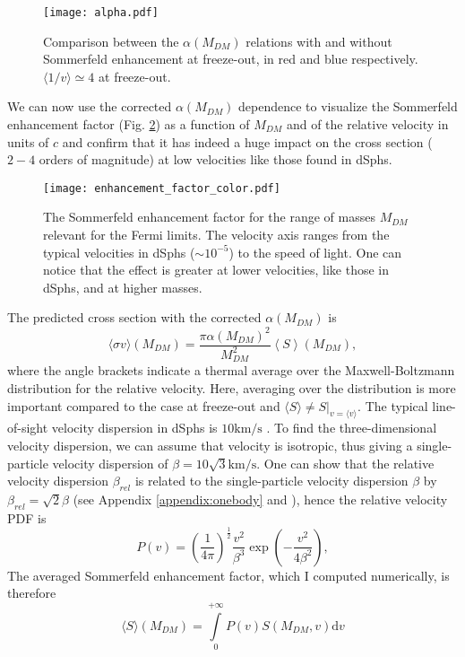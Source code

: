 \begin{figure}[htbp]
	\centering
	\texttt{[image: alpha.pdf]}
	\caption{Comparison between the \(\alpha (M_{DM} )\) relations with and without Sommerfeld enhancement at freeze-out, in red and blue respectively. \(\langle 1 / v \rangle \simeq 4 \) at freeze-out.}
	\label{fig:alpha}
\end{figure}

We can now use the corrected \(\alpha (M_{DM} )\) dependence to visualize the Sommerfeld enhancement factor (Fig. \ref{fig:enhancement_factor}) as a function of \(M_{DM} \) and of the relative velocity in units of \(c\) and confirm that it has indeed a huge impact on the cross section (\(2-4\) orders of magnitude) at low velocities like those found in dSphs.

\begin{figure}[htbp]
	\centering
	\texttt{[image: enhancement\_factor\_color.pdf]}
	\caption{The Sommerfeld enhancement factor for the range of masses \(M_{DM} \) relevant for the Fermi limits. The velocity axis ranges from the typical velocities in dSphs (\(\sim 10^{-5} \)) to the speed of light. One can notice that the effect is greater at lower velocities, like those in dSphs, and at higher masses.}
	\label{fig:enhancement_factor}
\end{figure}

The predicted cross section with the corrected \(\alpha (M_{DM} )\) is
\begin{equation}\label{eq:sigma_enhanced}
	\langle \sigma v \rangle (M_{DM} )= \frac{\pi \alpha (M_{DM} )^2}{M_{DM} ^2} \left \langle S \right \rangle(M_{DM} ),
\end{equation}
where the angle brackets indicate a thermal average over the Maxwell-Boltzmann distribution for the relative velocity. Here, averaging over the distribution is more important compared to the case at freeze-out and \(\langle S \rangle \neq S|_{v= \langle v \rangle }\). The typical line-of-sight velocity dispersion in dSphs is \(10 \mathrm{km / s} \) \cite{Walker_2013, Arkani_2009}. To find the three-dimensional velocity dispersion, we can assume that velocity is isotropic, thus giving a single-particle velocity dispersion of \(\beta = 10 \sqrt{3} \mathrm{km / s} \). One can show that the relative velocity dispersion \(\beta_{rel} \) is related to the single-particle velocity dispersion \(\beta \) by \(\beta _{rel} = \sqrt{2} \beta \) (see Appendix \ref{appendix:onebody} and \cite{Ferrer_2013}), hence the relative velocity PDF is
\begin{equation}
	P(v ) = \left( \frac{1}{4\pi } \right)^\frac{1}{2} \frac{v ^2}{\beta ^3} \exp \left( -\frac{v ^2}{4 \beta ^2} \right),
\end{equation}
The averaged Sommerfeld enhancement factor, which I computed numerically, is therefore
\begin{equation}
	\langle S \rangle (M_{DM} ) = \int\limits_0^{+ \infty } P(v ) S(M_{DM}, v ) \mathrm{d} v
\end{equation}


